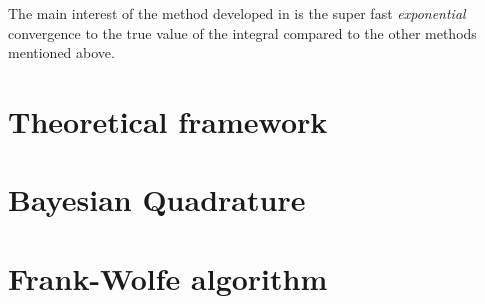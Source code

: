   The main interest of the method developed in \cite{FWBQ} is the super fast
  \textit{exponential} convergence to the true value of the integral compared to the other methods mentioned above.

\section{Theoretical framework}


\section{Bayesian Quadrature}
\label{sec:BQ}

\section{Frank-Wolfe algorithm}
\label{sec:FW}
